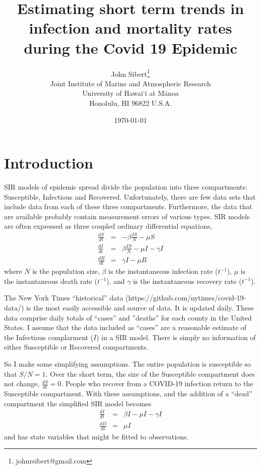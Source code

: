 \documentclass[12pt,letterpaper]{article}
\title{Estimating short term trends in infection and mortality rates
during the Covid 19 Epidemic}
\author{
John Sibert\thanks{johnrsibert@gmail.com}\\
Joint Institute of Marine and Atmospheric Research\\
University of Hawai`i at M\={a}noa\\
Honolulu, HI  96822 U.S.A.\\[0.125in]
\date{\today}
}
\newcommand\doublespacing{\baselineskip=1.6\normalbaselineskip}
\begin{document}
\maketitle

\doublespacing

\section*{Introduction}

SIR models of epidemic spread divide the population into three
compartments: Susceptible, Infectious and Recovered.
Unfortunately, there are few data sets that include data from each of
these three compartments. Furthermore, the data that are available
probably contain measurement errors of various types. SIR models are
often expressed as three coupled ordinary differential equations,
\begin{eqnarray}
\label{eqn:SIR}
\frac{dS}{dt} &=& -\beta\frac{IS}{N} - \mu S\\
\frac{dI}{dt} &=&  \beta\frac{IS}{N} - \mu I -\gamma I\\
\frac{dR}{dt} &=& \gamma I - \mu R 
\end{eqnarray}
where $N$ is the population size, $\beta$ is the instantaneous
infection rate ($t^{-1}$), $\mu$ is the instantaneous death rate
($t^{-1}$),  and $\gamma$ is the instantaneous recovery rate ($t^{-1}$).  

The New York Times ``historical'' data
(https://github.com/nytimes/covid-19-data/) is the
most easily accessible and source of data. It is updated daily. These
data comprise daily totals of ``cases'' and ''deaths'' for each county
in the United States. I assume that the data included as ``cases'' are
a reasonable estimate of the Infectious complarment ($I$) in a SIR model. 
There is
simply no information of either Susceptible or Recovered compartments.

So I make some simplifying assumptions. The entire population is
susceptible so that $S/N = 1$. Over the short term, the size of the
Susceptible compartment does not change, $\frac{dS}{dt} = 0$.
People who recover from a COVID-19 infection return to the Susceptible
compartment. With these assumptions, and the addition of a ``dead''
compartment the simplified SIR model becomes
\begin{eqnarray}
\label{eqn:sSIR}
\frac{dI}{dt} &=&  \beta I - \mu I -\gamma I\\
\frac{dD}{dt} &=& \mu I
\end{eqnarray}
and has state variables that might be fitted to observations.
\end{document}
